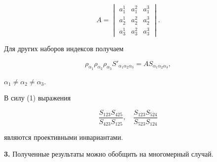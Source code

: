 $$


A=\begin{vmatrix}


a^{1}_{1}&a^{2}_{1}&a^{3}_{1}\\


a^{1}_{2}&a^{2}_{2}&a^{3}_{2}\\


a^{1}_{3}&a^{2}_{3}&a^{3}_{3}


\end{vmatrix}.


$$


Для других наборов индексов получаем


\begin{equation}


\rho_{\alpha_1} \rho_{\alpha_2} \rho_{\alpha_3}


S'_{\alpha_{1} \alpha_{2} \alpha_{3}}=A S_{\alpha_{1} \alpha_{2} \alpha_{3}},


\end{equation}


$\alpha_{1} \ne \alpha_{2} \ne \alpha_{3}$.


В силу (1) выражения


$$


\frac{S_{123}S_{425}}{S_{423}S_{125}},


\quad


\frac{S_{123}S_{524}}{S_{523}S_{124}}


$$


являются проективными инвариантами.


\medskip





{\bf 3.} Полученные результаты можно обобщить на многомерный случай.





